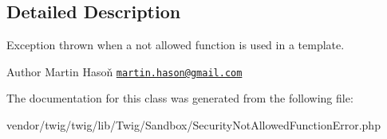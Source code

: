 \subsection{Detailed Description}
Exception thrown when a not allowed function is used in a template.

\begin{DoxyAuthor}{Author}
Martin Hasoň \href{mailto:martin.hason@gmail.com}{\tt martin.\+hason@gmail.\+com} 
\end{DoxyAuthor}


The documentation for this class was generated from the following file\+:\begin{DoxyCompactItemize}
\item 
vendor/twig/twig/lib/\+Twig/\+Sandbox/Security\+Not\+Allowed\+Function\+Error.\+php\end{DoxyCompactItemize}
